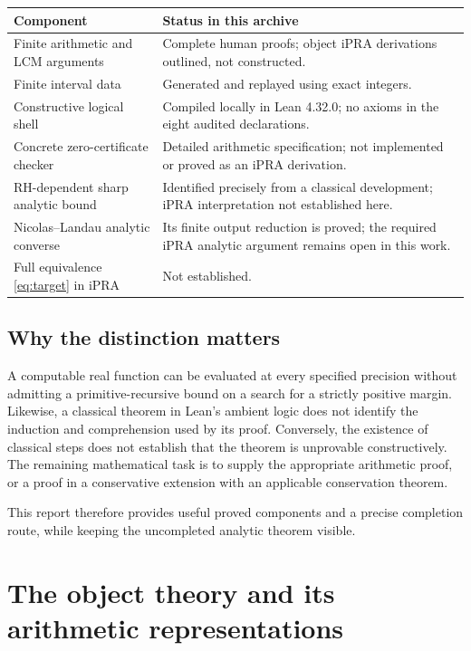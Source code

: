 \documentclass[11pt,a4paper]{article}
\theoremstyle{definition}
\begin{document}
\begin{center}
\small
\begin{tabular}{@{}>{\raggedright\arraybackslash}p{}
 >{\raggedright\arraybackslash}p{}@{}}
\toprule
Component & Status in this archive\\
\midrule
Finite arithmetic and LCM arguments & Complete human proofs; object iPRA
derivations outlined, not constructed.\\
Finite interval data & Generated and replayed using exact integers.\\
Constructive logical shell & Compiled locally in Lean 4.32.0; no axioms
in the eight audited declarations.\\
Concrete zero-certificate checker & Detailed arithmetic specification;
not implemented or proved as an iPRA derivation.\\
RH-dependent sharp analytic bound & Identified precisely from a classical
development; iPRA interpretation not established here.\\
Nicolas--Landau analytic converse & Its finite output reduction is proved;
the required iPRA analytic argument remains open in this work.\\
Full equivalence \eqref{eq:target} in iPRA & Not established.\\
\bottomrule
\end{tabular}
\end{center}

\subsection{Why the distinction matters}

A computable real function can be evaluated at every specified precision
without admitting a primitive-recursive bound on a search for a strictly
positive margin. Likewise, a classical theorem in Lean's ambient logic
does not identify the induction and comprehension used by its proof.
Conversely, the existence of classical steps does not establish that the
theorem is unprovable constructively. The remaining mathematical task is
to supply the appropriate arithmetic proof, or a proof in a conservative
extension with an applicable conservation theorem.

This report therefore provides useful proved components and a precise
completion route, while keeping the uncompleted analytic theorem visible.

\section{The object theory and its arithmetic representations}
\end{document}
